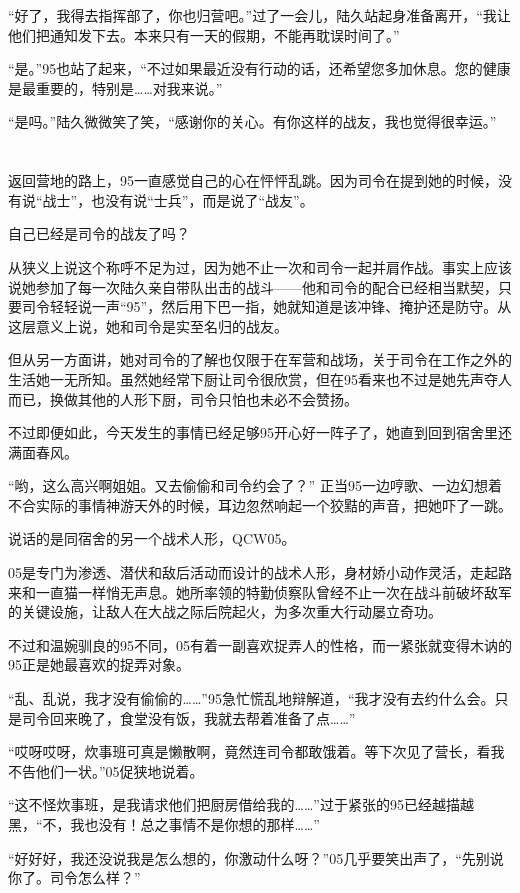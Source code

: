 “好了，我得去指挥部了，你也归营吧。”过了一会儿，陆久站起身准备离开，“我让他们把通知发下去。本来只有一天的假期，不能再耽误时间了。”

“是。”95也站了起来，“不过如果最近没有行动的话，还希望您多加休息。您的健康是最重要的，特别是……对我来说。”

“是吗。”陆久微微笑了笑，“感谢你的关心。有你这样的战友，我也觉得很幸运。”
\section*{}

返回营地的路上，95一直感觉自己的心在怦怦乱跳。因为司令在提到她的时候，没有说“战士”，也没有说“士兵”，而是说了“战友”。

自己已经是司令的战友了吗？

从狭义上说这个称呼不足为过，因为她不止一次和司令一起并肩作战。事实上应该说她参加了每一次陆久亲自带队出击的战斗——他和司令的配合已经相当默契，只要司令轻轻说一声“95”，然后用下巴一指，她就知道是该冲锋、掩护还是防守。从这层意义上说，她和司令是实至名归的战友。

但从另一方面讲，她对司令的了解也仅限于在军营和战场，关于司令在工作之外的生活她一无所知。虽然她经常下厨让司令很欣赏，但在95看来也不过是她先声夺人而已，换做其他的人形下厨，司令只怕也未必不会赞扬。

不过即便如此，今天发生的事情已经足够95开心好一阵子了，她直到回到宿舍里还满面春风。

“哟，这么高兴啊姐姐。又去偷偷和司令约会了？”
正当95一边哼歌、一边幻想着不合实际的事情神游天外的时候，耳边忽然响起一个狡黠的声音，把她吓了一跳。

说话的是同宿舍的另一个战术人形，QCW05。

05是专门为渗透、潜伏和敌后活动而设计的战术人形，身材娇小动作灵活，走起路来和一直猫一样悄无声息。她所率领的特勤侦察队曾经不止一次在战斗前破坏敌军的关键设施，让敌人在大战之际后院起火，为多次重大行动屡立奇功。

不过和温婉驯良的95不同，05有着一副喜欢捉弄人的性格，而一紧张就变得木讷的95正是她最喜欢的捉弄对象。

“乱、乱说，我才没有偷偷的……”95急忙慌乱地辩解道，“我才没有去约什么会。只是司令回来晚了，食堂没有饭，我就去帮着准备了点……”

“哎呀哎呀，炊事班可真是懒散啊，竟然连司令都敢饿着。等下次见了营长，看我不告他们一状。”05促狭地说着。

“这不怪炊事班，是我请求他们把厨房借给我的……”过于紧张的95已经越描越黑，“不，我也没有！总之事情不是你想的那样……”

“好好好，我还没说我是怎么想的，你激动什么呀？”05几乎要笑出声了，“先别说你了。司令怎么样？”

